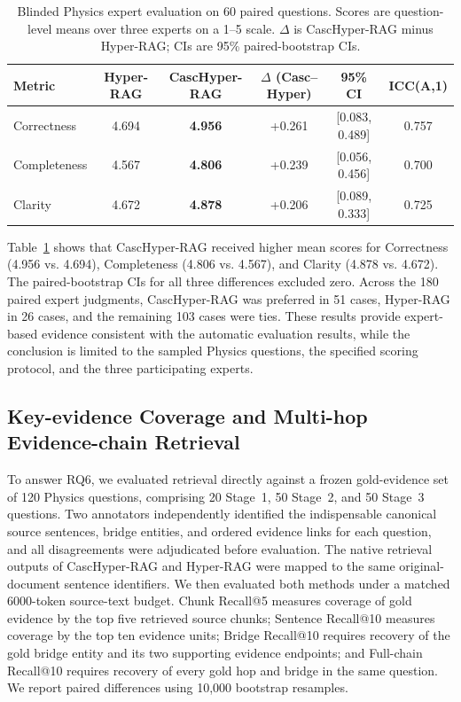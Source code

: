 \documentclass[a4paper,fleqn]{cas-dc}
\begin{document}
\begin{table}[t]
\centering
\caption{Blinded Physics expert evaluation on 60 paired questions. Scores are question-level means over three experts on a 1--5 scale. $\Delta$ is CascHyper-RAG minus Hyper-RAG; CIs are 95\% paired-bootstrap CIs.}
\label{tab:physics_expert_evaluation}
\setlength{\tabcolsep}{5pt}
\small
\begin{tabular}{lccccc}
\toprule
Metric & Hyper-RAG & CascHyper-RAG & $\Delta$ (Casc--Hyper) & 95\% CI & ICC(A,1) \\
\midrule
Correctness & 4.694 & \textbf{4.956} & +0.261 & [0.083, 0.489] & 0.757 \\
Completeness & 4.567 & \textbf{4.806} & +0.239 & [0.056, 0.456] & 0.700 \\
Clarity & 4.672 & \textbf{4.878} & +0.206 & [0.089, 0.333] & 0.725 \\
\bottomrule
\end{tabular}
\end{table}

Table~\ref{tab:physics_expert_evaluation} shows that CascHyper-RAG received higher mean scores for Correctness (4.956 vs. 4.694), Completeness (4.806 vs. 4.567), and Clarity (4.878 vs. 4.672). The paired-bootstrap CIs for all three differences excluded zero. Across the 180 paired expert judgments, CascHyper-RAG was preferred in 51 cases, Hyper-RAG in 26 cases, and the remaining 103 cases were ties. These results provide expert-based evidence consistent with the automatic evaluation results, while the conclusion is limited to the sampled Physics questions, the specified scoring protocol, and the three participating experts.

\subsection{Key-evidence Coverage and Multi-hop Evidence-chain Retrieval}

To answer RQ6, we evaluated retrieval directly against a frozen gold-evidence set of 120 Physics questions, comprising 20 Stage~1, 50 Stage~2, and 50 Stage~3 questions. Two annotators independently identified the indispensable canonical source sentences, bridge entities, and ordered evidence links for each question, and all disagreements were adjudicated before evaluation. The native retrieval outputs of CascHyper-RAG and Hyper-RAG were mapped to the same original-document sentence identifiers. We then evaluated both methods under a matched 6000-token source-text budget. Chunk Recall@5 measures coverage of gold evidence by the top five retrieved source chunks; Sentence Recall@10 measures coverage by the top ten evidence units; Bridge Recall@10 requires recovery of the gold bridge entity and its two supporting evidence endpoints; and Full-chain Recall@10 requires recovery of every gold hop and bridge in the same question. We report paired differences using 10,000 bootstrap resamples.
\end{document}
